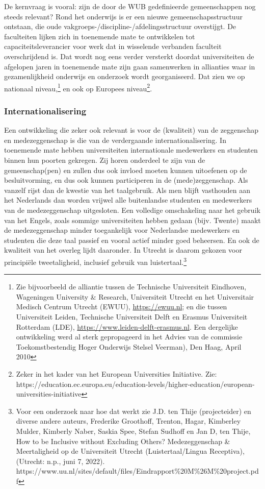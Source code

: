 \documentclass[empirical, authordate, ]{new-jote-article}
\begin{document}
	De kernvraag is vooral: zijn de door de WUB gedefinieerde gemeenschappen nog steeds relevant? Rond het onderwijs is er een nieuwe gemeenschapsstructuur ontstaan, die oude vakgroeps-/discipline-/afdelingsstructuur overstijgt. De faculteiten lijken zich in toenemende mate te ontwikkelen tot capaciteitsleverancier voor werk dat in wisselende verbanden faculteit overschrijdend is. Dat wordt nog eens verder versterkt doordat universiteiten de afgelopen jaren in toenemende mate zijn gaan samenwerken in allianties waar in gezamenlijkheid onderwijs en onderzoek wordt georganiseerd. Dat zien we op nationaal niveau,\footnote{Zie bijvoorbeeld de alliantie tussen de Technische Universiteit Eindhoven, Wageningen University \& Research, Universiteit Utrecht en het Universitair Medisch Centrum Utrecht (EWUU), \href{https://ewuu.nl}{https://ewuu.nl}; en die tussen Universiteit Leiden, Technische Universiteit Delft en Erasmus Universiteit Rotterdam (LDE), \href{https://www.leiden-delft-erasmus.nl}{https://www.leiden-delft-erasmus.nl}. Een dergelijke ontwikkeling werd al sterk gepropageerd in het Advies van de commissie Toekomstbestendig Hoger Onderwijs Stelsel Veerman), Den Haag, April 2010} en ook op Europees niveau\footnote{Zeker in het kader van het European Universities Initiative. Zie: https://education.ec.europa.eu/education-levels/higher-education/european-universities-initiative}.



	\subsubsection{Internationalisering}



	Een ontwikkeling die zeker ook relevant is voor de (kwaliteit) van de zeggenschap en medezeggenschap is die van de verdergaande internationalisering. In toenemende mate hebben universiteiten internationale medewerkers en studenten binnen hun poorten gekregen. Zij horen onderdeel te zijn van de gemeenschap(pen) en zullen dus ook invloed moeten kunnen uitoefenen op de besluitvorming, en dus ook kunnen participeren in de (mede)zeggenschap. Als vanzelf rijst dan de kwestie van het taalgebruik. Als men blijft vasthouden aan het Nederlands dan worden vrijwel alle buitenlandse studenten en medewerkers van de medezeggenschap uitgesloten. Een volledige omschakeling naar het gebruik van het Engels, zoals sommige universiteiten hebben gedaan (bijv. Twente) maakt de medezeggenschap minder toegankelijk voor Nederlandse medewerkers en studenten die deze taal passief en vooral actief minder goed beheersen. En ook de kwaliteit van het overleg lijdt daaronder. In Utrecht is daarom gekozen voor principiële tweetaligheid, inclusief gebruik van luistertaal.\footnote{Voor een onderzoek naar hoe dat werkt zie J.D. ten Thije (projecteider) en diverse andere auteurs, Frederike Groothoff, Trenton, Hagar, Kimberley Mulder, Kimberly Naber, Saskia Spee, Stefan Sudhoff en Jan D, ten Thije, How to be Inclusive without Excluding Others? Medezeggenschap \& Meertaligheid op de Universiteit Utrecht (Luistertaal/Lingua Receptiva), (Utrecht: n.p., juni 7, 2022). https://www.uu.nl/sites/default/files/Eindrapport\%20M\%26M\%20project.pdf}
\end{document}
